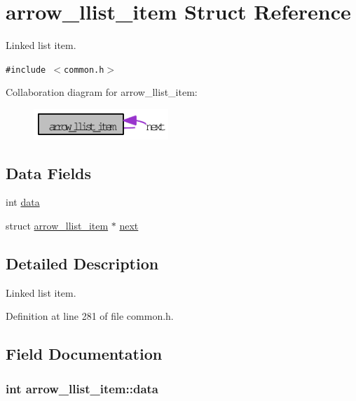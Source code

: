 \hypertarget{structarrow__llist__item}{
\section{arrow\_\-llist\_\-item Struct Reference}
\label{structarrow__llist__item}
}
Linked list item.  


{\tt \#include $<$common.h$>$}

Collaboration diagram for arrow\_\-llist\_\-item:\nopagebreak
\begin{figure}[H]
\begin{center}
\leavevmode
\includegraphics[width=144pt]{structarrow__llist__item__coll__graph}
\end{center}
\end{figure}
\subsection*{Data Fields}
\begin{CompactItemize}
\item 
int \hyperlink{structarrow__llist__item_a90478f82ffebd976893d9b84b6ce189}{data}
\item 
struct \hyperlink{structarrow__llist__item}{arrow\_\-llist\_\-item} $\ast$ \hyperlink{structarrow__llist__item_81a998b260ab022b05f1ff572327b871}{next}
\end{CompactItemize}


\subsection{Detailed Description}
Linked list item. 

Definition at line 281 of file common.h.

\subsection{Field Documentation}
\hypertarget{structarrow__llist__item_a90478f82ffebd976893d9b84b6ce189}{
\subsubsection[{data}]{\setlength{\rightskip}{0pt plus 5cm}int {\bf arrow\_\-llist\_\-item::data}}}
\label{structarrow__llist__item_a90478f82ffebd976893d9b84b6ce189}


